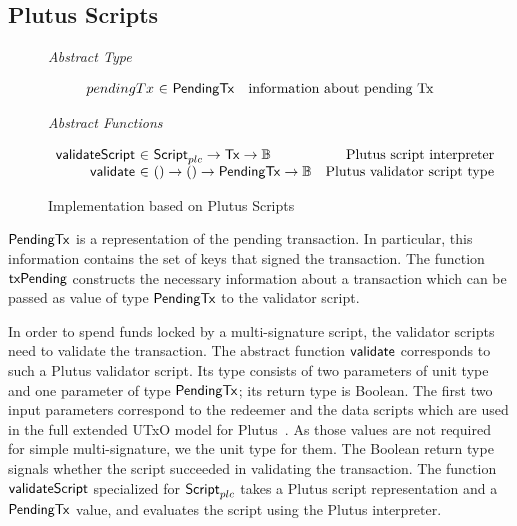 \documentclass[11pt,a4paper,dvipsnames]{article}
\newcommand{\Bool}{\ensuremath{\mathbb{B}}}
\newcommand{\Tx}{\type{Tx}}
\newcommand{\Script}{\type{Script}}
\newcommand{\ScriptPlutus}{\Script_{plc}}
\newcommand{\PendingTx}{\type{PendingTx}}
\theoremstyle{definition}
\begin{document}
\subsection{Plutus Scripts}
\label{sec:plutus-scripts}

\begin{figure*}[hbt]
  \emph{Abstract Type}

  \begin{equation*}
    \begin{array}{r@{~\in~}lr}
      pendingTx & \PendingTx & \text{information about pending Tx}
    \end{array}
  \end{equation*}

  \emph{Abstract Functions}

  \begin{equation*}
    \begin{array}{r@{~\in~}lr}
      \fun{validateScript} & \ScriptPlutus \to \Tx \to \Bool & \text{Plutus script
                                                               interpreter} \\
      \fun{validate} & () \to () \to \PendingTx \to \Bool & \text{Plutus
                                                            validator script type}
    \end{array}
  \end{equation*}
  \caption{Implementation based on Plutus Scripts}
  \label{fig:types_defs_plutus}
\end{figure*}

$\PendingTx$ is a representation of the pending transaction. In particular, this
information contains the set of keys that signed the transaction. The function
$\mathsf{txPending}$ constructs the necessary information about a transaction
which can be passed as value of type $\PendingTx$ to the validator script.

In order to spend funds locked by a multi-signature script, the validator
scripts need to validate the transaction. The abstract function $\mathsf{validate}$
corresponds to such a Plutus validator script. Its type consists of two
parameters of unit type and one parameter of type $\PendingTx$; its return type
is Boolean. The first two input parameters correspond to the redeemer and the
data scripts which are used in the full extended UTxO model for
Plutus~\cite{plutus_eutxo}. As those values are not required for simple
multi-signature, we the unit type for them. The Boolean return type signals
whether the script succeeded in validating the transaction. The function
$\mathsf{validateScript}$ specialized for $\ScriptPlutus$ takes a Plutus script
representation and a $\PendingTx$ value, and evaluates the script using the
Plutus interpreter.
\end{document}
